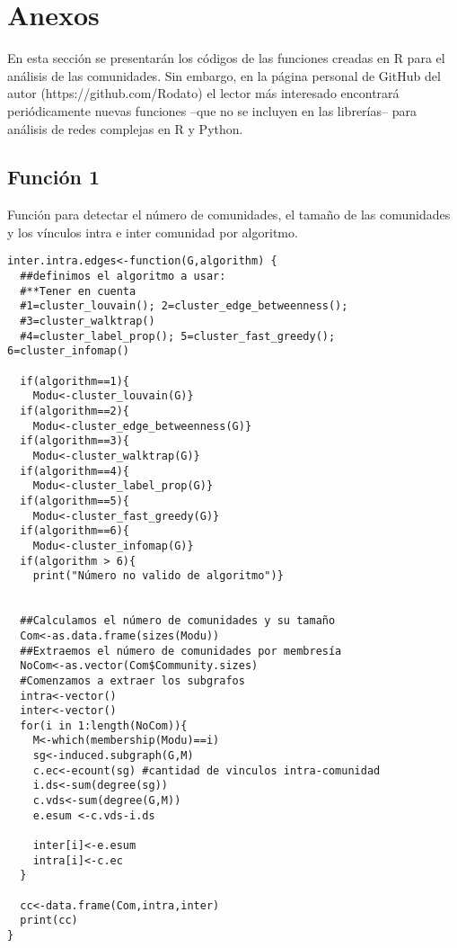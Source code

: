 \documentclass[12pt,letter]{article}
\begin{document}
\newpage
\section{Anexos}
En esta sección se presentarán los códigos de las funciones creadas en R para el análisis de las comunidades. Sin embargo, en la página personal de GitHub del autor (https://github.com/Rodato) el lector más interesado encontrará periódicamente nuevas funciones --que no se incluyen en las librerías-- para análisis de redes complejas en R y Python.
\subsection{Función 1}
Función para detectar el número de comunidades, el tamaño de las comunidades y los vínculos intra e inter comunidad por algoritmo.

\vspace{0.5cm}
\lstset{language=R, basicstyle=\footnotesize}
\begin{lstlisting}[frame=single]
inter.intra.edges<-function(G,algorithm) {
  ##definimos el algoritmo a usar:
  #**Tener en cuenta 
  #1=cluster_louvain(); 2=cluster_edge_betweenness(); 
  #3=cluster_walktrap()
  #4=cluster_label_prop(); 5=cluster_fast_greedy(); 6=cluster_infomap()
  
  if(algorithm==1){
    Modu<-cluster_louvain(G)}
  if(algorithm==2){
    Modu<-cluster_edge_betweenness(G)}
  if(algorithm==3){
    Modu<-cluster_walktrap(G)}
  if(algorithm==4){
    Modu<-cluster_label_prop(G)}
  if(algorithm==5){
    Modu<-cluster_fast_greedy(G)}
  if(algorithm==6){
    Modu<-cluster_infomap(G)}
  if(algorithm > 6){
    print("Número no valido de algoritmo")}
  
  
  ##Calculamos el número de comunidades y su tamaño
  Com<-as.data.frame(sizes(Modu))
  ##Extraemos el número de comunidades por membresía
  NoCom<-as.vector(Com$Community.sizes)
  #Comenzamos a extraer los subgrafos
  intra<-vector()
  inter<-vector()
  for(i in 1:length(NoCom)){
    M<-which(membership(Modu)==i)
    sg<-induced.subgraph(G,M)
    c.ec<-ecount(sg) #cantidad de vinculos intra-comunidad
    i.ds<-sum(degree(sg))
    c.vds<-sum(degree(G,M))
    e.esum <-c.vds-i.ds
    
    inter[i]<-e.esum
    intra[i]<-c.ec
  }

  cc<-data.frame(Com,intra,inter)
  print(cc)
}
\end{lstlisting}
\end{document}
